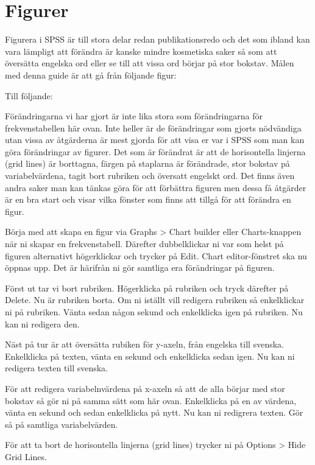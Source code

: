 \documentclass[
]{book}
\begin{document}
\hypertarget{figurer}{%
\section{Figurer}\label{figurer}}

Figurera i SPSS är till stora delar redan publikationsredo och det som ibland kan vara lämpligt att förändra är kanske mindre kosmetiska saker så som att översätta engelska ord eller se till att vissa ord börjar på stor bokstav. Målen med denna guide är att gå från följande figur:

Till följande:

Förändringarna vi har gjort är inte lika stora som förändringarna för frekvenstabellen här ovan. Inte heller är de förändringar som gjorts nödvändiga utan vissa av åtgärderna är mest gjorda för att visa er var i SPSS som man kan göra förändringar av figurer. Det som är förändrat är att de horisontella linjerna (grid lines) är borttagna, färgen på staplarna är förändrade, stor bokstav på variabelvärdena, tagit bort rubriken och översatt engelskt ord. Det finns även andra saker man kan tänkas göra för att förbättra figuren men dessa få åtgärder är en bra start och visar vilka fönster som finns att tillgå för att förändra en figur.

Börja med att skapa en figur via Graphs \textgreater{} Chart builder eller Charts-knappen när ni skapar en frekvenstabell. Därefter dubbelklickar ni var som helst på figuren alternativt högerklickar och trycker på Edit. Chart editor-fönstret ska nu öppnas upp. Det är härifrån ni gör samtliga era förändringar på figuren.

Först ut tar vi bort rubriken. Högerklicka på rubriken och tryck därefter på Delete. Nu är rubriken borta. Om ni iställt vill redigera rubriken så enkelklickar ni på rubriken. Vänta sedan någon sekund och enkelklicka igen på rubriken. Nu kan ni redigera den.

Näst på tur är att översätta rubiken för y-axeln, från engelska till svenska. Enkelklicka på texten, vänta en sekund och enkelklicka sedan igen. Nu kan ni redigera texten till svenska.

För att redigera variabelnvärdena på x-axeln så att de alla börjar med stor bokstav så gör ni på samma sätt som här ovan. Enkelklicka på en av värdena, vänta en sekund och sedan enkelklicka på nytt. Nu kan ni redigrera texten. Gör så på samtliga variabelvärden.

För att ta bort de horisontella linjerna (grid lines) trycker ni på Options \textgreater{} Hide Grid Lines.
\end{document}
